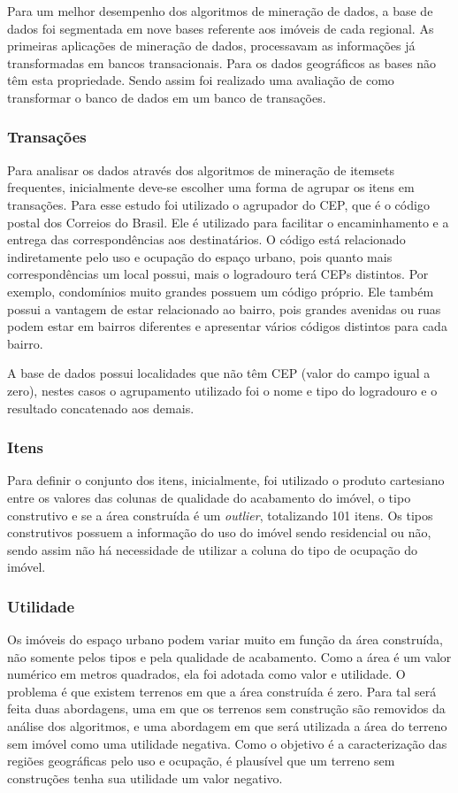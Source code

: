 \documentclass[12pt]{article}
\begin{document}
Para um melhor desempenho dos algoritmos de mineração de dados, a base de dados foi segmentada em nove bases referente aos imóveis de cada regional. As primeiras aplicações de mineração de dados, processavam as informações já transformadas em bancos transacionais. Para os dados geográficos as bases não têm esta propriedade. Sendo assim foi realizado uma avaliação de como transformar o banco de dados em um banco de transações.

\subsubsection{Transações}
Para analisar os dados através dos algoritmos de mineração de itemsets frequentes, inicialmente deve-se escolher uma forma de agrupar os itens em transações. Para esse estudo foi utilizado o agrupador do CEP, que é o código postal dos Correios do Brasil. Ele é utilizado para facilitar o encaminhamento e a entrega das correspondências aos destinatários. O código está relacionado indiretamente pelo uso e ocupação do espaço urbano, pois quanto mais correspondências um local possui, mais o logradouro terá CEPs distintos. Por exemplo, condomínios muito grandes possuem um código próprio. Ele também possui a vantagem de estar relacionado ao bairro, pois grandes avenidas ou ruas podem estar em bairros diferentes e apresentar vários códigos distintos para cada bairro. 

A base de dados possui localidades que não têm CEP (valor do campo igual a zero), nestes casos o agrupamento utilizado foi o nome e tipo do logradouro e o resultado concatenado aos demais.
 
 \subsubsection{Itens}
 Para definir o conjunto dos itens, inicialmente, foi utilizado o produto cartesiano entre os valores das colunas de qualidade do acabamento do imóvel, o tipo construtivo e se a área construída é um \textit{outlier}, totalizando 101 itens. Os tipos construtivos possuem a informação do uso do imóvel sendo residencial ou não, sendo assim não há necessidade de utilizar a coluna do tipo de ocupação do imóvel.

 \subsubsection{Utilidade}
 Os imóveis do espaço urbano podem variar muito em função da área construída, não somente pelos tipos e pela qualidade de acabamento. Como a área é um valor numérico em metros quadrados, ela foi adotada como valor e utilidade. O problema é que existem terrenos em que a área construída é zero. Para tal será feita duas abordagens, uma em que os terrenos sem construção são removidos da análise dos algoritmos, e uma abordagem em que será utilizada a área do terreno sem imóvel como uma utilidade negativa. Como o objetivo é a caracterização das regiões geográficas pelo uso e ocupação, é plausível que um terreno sem construções tenha sua utilidade um valor negativo.
\end{document}
